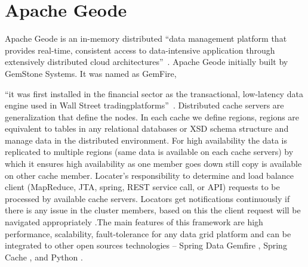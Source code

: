 \section{Apache Geode}

Apache Geode is an in-memory distributed ``data management platform
that provides real-time, consistent access to data-intensive
application through extensively distributed cloud
architectures''~\cite{hid-sp18-514-apachegeodewiki}. Apache Geode
initially built by GemStone Systems. It was named as GemFire, 

``it was
first installed in the financial sector as the transactional,
low-latency data engine used in Wall Street tradingplatforms''~\cite{hid-sp18-514-apachegeodewiki}.
Distributed cache servers are generalization that define the nodes. In
each cache we define regions, regions are equivalent to tables in any
relational databases or XSD schema structure and manage data in the
distributed environment. For high availability the data is replicated
to multiple regions (same data is available on each cache servers) by
which it ensures high availability as one member goes down still copy
is available on other cache member. Locater’s responsibility to
determine and load balance client (MapReduce, JTA, spring, REST service
call, or API) requests to be processed by available cache servers.
Locators get notifications continuously if there is any issue in the
cluster members, based on this the client request will be navigated
appropriately \cite{hid-sp18-514-apachegeodewiki}.The main features of
this framework are high performance, scalability, fault-tolerance for
any data grid platform and can be integrated to other open sources
technologies – Spring Data
Gemfire \cite{hid-sp18-514-geodespringgemfire}, Spring
Cache \cite{hid-sp18-514-geodespringcache}, and
Python \cite{hid-sp18-514-geodepython}.
